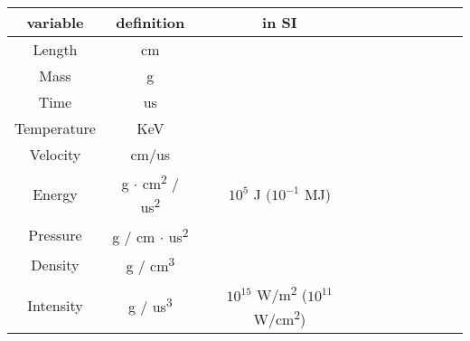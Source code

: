 \documentclass[11pt]{article}
\begin{document}
\begin{center}
    \begin{tabular}{|Sc|Sc|Sc|Sc|Sc|}
        \hline
        variable & definition & in SI \\
        \hline 
        Length & cm & \\
        \hline
        Mass & g & \\
        \hline
        Time & us & \\
        \hline
        Temperature & KeV & \\
        \hline
        Velocity & cm/us & \\
        \hline
        Energy & g \( \cdot \) cm\textsuperscript{2} / us\textsuperscript{2} & $10^5$ J  $(10^{-1}$ MJ)\\
        \hline 
        Pressure & g / cm \( \cdot \) us\textsuperscript{2} & \\
        \hline
        Density & g / cm\textsuperscript{3} & \\
        \hline 
        Intensity & g / us\textsuperscript{3} & $10^{15}$ W/m\textsuperscript{2} ($10^{11}$ W/cm\textsuperscript{2})\\
        \hline
    \end{tabular}
\end{center}
\end{document}
